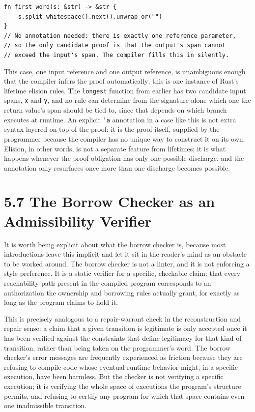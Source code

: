 \documentclass[11pt]{book}
\begin{document}
\begin{lstlisting}
fn first_word(s: &str) -> &str {
    s.split_whitespace().next().unwrap_or("")
}
// No annotation needed: there is exactly one reference parameter,
// so the only candidate proof is that the output's span cannot
// exceed the input's span. The compiler fills this in silently.
\end{lstlisting}

This case, one input reference and one output reference, is unambiguous enough that the compiler infers the proof automatically; this is one instance of Rust's lifetime elision rules. The \texttt{longest} function from earlier has two candidate input spans, \texttt{x} and \texttt{y}, and no rule can determine from the signature alone which one the return value's span should be tied to, since that depends on which branch executes at runtime. An explicit \texttt{'a} annotation in a case like this is not extra syntax layered on top of the proof; it is the proof itself, supplied by the programmer because the compiler has no unique way to construct it on its own. Elision, in other words, is not a separate feature from lifetimes; it is what happens whenever the proof obligation has only one possible discharge, and the annotation only resurfaces once more than one discharge becomes possible.

\section*{5.7 The Borrow Checker as an Admissibility Verifier}

It is worth being explicit about what the borrow checker is, because most introductions leave this implicit and let it sit in the reader's mind as an obstacle to be worked around. The borrow checker is not a linter, and it is not enforcing a style preference. It is a static verifier for a specific, checkable claim: that every reachability path present in the compiled program corresponds to an authorization the ownership and borrowing rules actually grant, for exactly as long as the program claims to hold it.

This is precisely analogous to a repair-warrant check in the reconstruction and repair sense: a claim that a given transition is legitimate is only accepted once it has been verified against the constraints that define legitimacy for that kind of transition, rather than being taken on the programmer's word. The borrow checker's error messages are frequently experienced as friction because they are refusing to compile code whose eventual runtime behavior might, in a specific execution, have been harmless. But the checker is not verifying a specific execution; it is verifying the whole space of executions the program's structure permits, and refusing to certify any program for which that space contains even one inadmissible transition.
\end{document}
